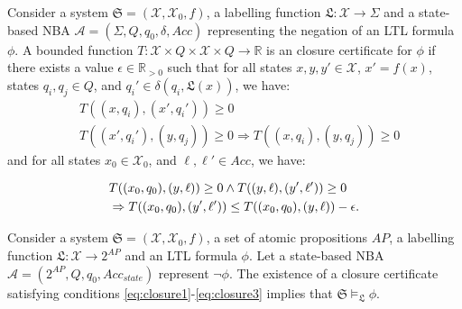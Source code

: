 \documentclass[acmlarge]{acmart}
\begin{document}
\begin{definition}
\label{LTLCC}
Consider a system $\mathfrak{S} = (\mathcal{X}, \mathcal{X}_0, f)$, a labelling function $\mathfrak{L} : \mathcal{X} \rightarrow \Sigma$ and a state-based NBA $\mathcal{A} = (\Sigma, Q, q_0, \delta, Acc)$ representing the negation of an LTL formula $\phi$. A bounded function $T : \mathcal{X} \times Q \times \mathcal{X} \times Q \rightarrow \mathbb{R}$ is an closure certificate for $\phi$ if there exists a value $\epsilon \in \mathbb{R}_{> 0}$ such that for all states $x, y, y' \in \mathcal{X}$, $x' = f(x)$, states $q_i, q_j \in Q$, and $q_i' \in \delta(q_i, \mathfrak{L}(x))$, we have:
\begin{align}
    &T((x, q_i), (x', q_i')) \geq 0 \label{eq:closure1} \\
    &T((x', q_i'), (y, q_j)) \geq 0 \Rightarrow T((x, q_i), (y, q_j)) \geq 0 \label{eq:closure2}
\end{align}
and for all states $x_0 \in \mathcal{X}_0$, and $\ell, \ell' \in Acc$, we have:

\begin{align}
  & T((x_0, q_0), (y, \ell)) \geq 0 \land T((y, \ell), (y', \ell')) \geq 0 \notag \\
  &\Rightarrow T((x_0, q_0), (y', \ell')) \leq T((x_0, q_0), (y, \ell)) - \epsilon. \label{eq:closure3}
\end{align}
\end{definition}

\begin{theorem}[LTL]
Consider a system $\mathfrak{S}=(\mathcal{X}, \mathcal{X}_0, f)$, a set of atomic propositions $AP$, a labelling function $\mathfrak{L}: \mathcal{X} \rightarrow 2^{AP}$ and an LTL formula $\phi$. Let a state-based NBA $\mathcal{A} = (2^{AP}, Q, q_0, Acc_{state})$ represent $\neg \phi$. The existence of a closure certificate satisfying conditions \eqref{eq:closure1}-\eqref{eq:closure3} implies that $\mathfrak{S} \models_\mathfrak{L} \phi$.
\end{theorem}


\end{document}
